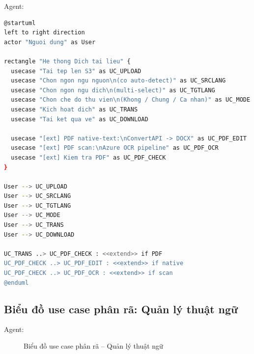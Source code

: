 Agent:
\begin{lstlisting}[language=bash, caption={PlantUML source -- Use Case phan ra: Dich tai lieu}]
@startuml
left to right direction
actor "Nguoi dung" as User

rectangle "He thong Dich tai lieu" {
  usecase "Tai tep len S3" as UC_UPLOAD
  usecase "Chon ngon ngu nguon\n(co auto-detect)" as UC_SRCLANG
  usecase "Chon ngon ngu dich\n(multi-select)" as UC_TGTLANG
  usecase "Chon che do thu vien\n(Khong / Chung / Ca nhan)" as UC_MODE
  usecase "Kich hoat dich" as UC_TRANS
  usecase "Tai ket qua ve" as UC_DOWNLOAD

  usecase "[ext] PDF native-text:\nConvertAPI -> DOCX" as UC_PDF_EDIT
  usecase "[ext] PDF scan:\nAzure OCR pipeline" as UC_PDF_OCR
  usecase "[ext] Kiem tra PDF" as UC_PDF_CHECK
}

User --> UC_UPLOAD
User --> UC_SRCLANG
User --> UC_TGTLANG
User --> UC_MODE
User --> UC_TRANS
User --> UC_DOWNLOAD

UC_TRANS ..> UC_PDF_CHECK : <<extend>> if PDF
UC_PDF_CHECK ..> UC_PDF_EDIT : <<extend>> if native
UC_PDF_CHECK ..> UC_PDF_OCR : <<extend>> if scan
@enduml
\end{lstlisting}

\subsection{Biểu đồ use case phân rã: Quản lý thuật ngữ}

Agent:

\begin{figure}[H]
\centering
{}
\caption{Biểu đồ use case phân rã -- Quản lý thuật ngữ}
\label{fig:usecase_library}
\end{figure}

